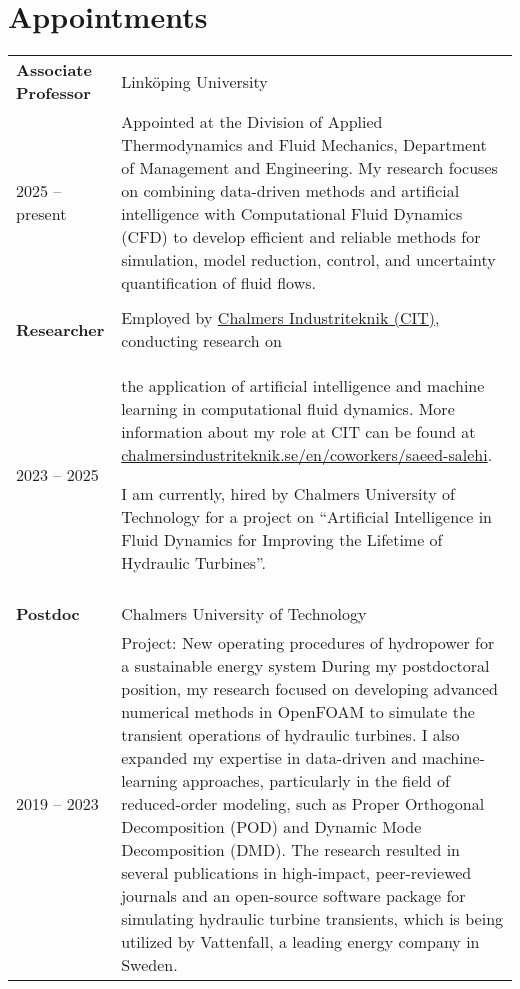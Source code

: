 \section{Appointments}{}

\begin{tabularx}{\textwidth}{l X}

    \textbf{Associate Professor} & Linköping University \\
    2025 -- present & Appointed at the Division of Applied Thermodynamics and Fluid Mechanics, Department of Management and Engineering. My research focuses on combining data-driven methods and artificial intelligence with Computational Fluid Dynamics (CFD) to develop efficient and reliable methods for simulation, model reduction, control, and uncertainty quantification of fluid flows. \\
    \multicolumn{2}{c}{} \\
    
    \textbf{Researcher} & Employed by \href{https://chalmersindustriteknik.se/en/}{Chalmers Industriteknik (CIT)}, conducting research on \\
    2023 -- 2025 & the application of artificial intelligence and machine learning in computational fluid dynamics. More information about my role at CIT can be found at \href{https://chalmersindustriteknik.se/en/coworkers/saeed-salehi/}{chalmersindustriteknik.se/en/coworkers/saeed-salehi}.
    
    I am currently, hired by Chalmers University of Technology for a project on ``Artificial Intelligence in Fluid Dynamics for Improving the Lifetime of Hydraulic Turbines''.
    \\
    \multicolumn{2}{c}{} \\
    
    \textbf{Postdoc} & Chalmers University of Technology \\
    2019 -- 2023 & Project: New operating procedures of hydropower for a sustainable energy system
    During my postdoctoral position, my research focused on developing advanced numerical methods in OpenFOAM to simulate the transient operations of hydraulic turbines. I also expanded my expertise in data-driven and machine-learning approaches, particularly in the field of reduced-order modeling, such as Proper Orthogonal Decomposition (POD) and Dynamic Mode Decomposition (DMD).    
    The research resulted in several publications in high-impact, peer-reviewed journals and an open-source software package for simulating hydraulic turbine transients, which is being utilized by Vattenfall, a leading energy company in Sweden.
\end{tabularx}

